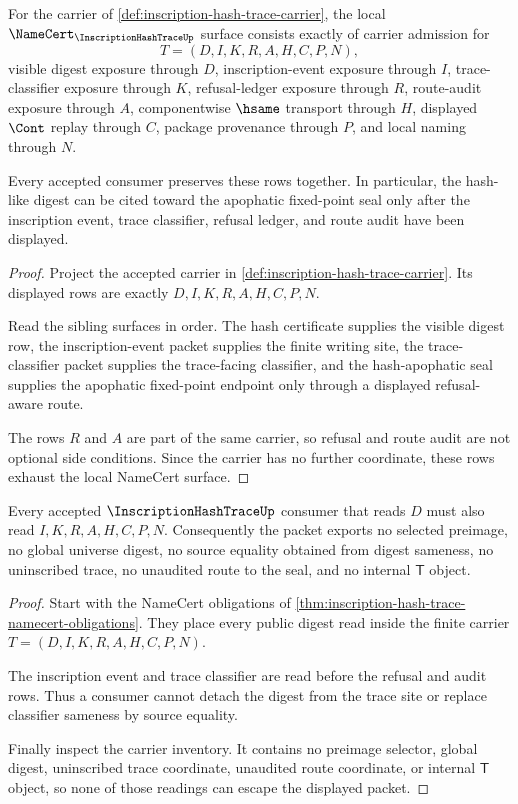 \begin{theorem}
\label{thm:inscription-hash-trace-namecert-obligations}
For the carrier of \autoref{def:inscription-hash-trace-carrier}, the local $\NameCert_{\InscriptionHashTraceUp}$ surface consists exactly of carrier admission for
$$
T=(D,I,K,R,A,H,C,P,N),
$$
visible digest exposure through $D$, inscription-event exposure through $I$, trace-classifier exposure through $K$, refusal-ledger exposure through $R$, route-audit exposure through $A$, componentwise $\hsame$ transport through $H$, displayed $\Cont$ replay through $C$, package provenance through $P$, and local naming through $N$.

Every accepted consumer preserves these rows together. In particular, the hash-like digest can be cited toward the apophatic fixed-point seal only after the inscription event, trace classifier, refusal ledger, and route audit have been displayed.
\end{theorem}
\begin{proof}
Project the accepted carrier in \autoref{def:inscription-hash-trace-carrier}. Its displayed rows are exactly $D,I,K,R,A,H,C,P,N$.

Read the sibling surfaces in order. The hash certificate supplies the visible digest row, the inscription-event packet supplies the finite writing site, the trace-classifier packet supplies the trace-facing classifier, and the hash-apophatic seal supplies the apophatic fixed-point endpoint only through a displayed refusal-aware route.

The rows $R$ and $A$ are part of the same carrier, so refusal and route audit are not optional side conditions. Since the carrier has no further coordinate, these rows exhaust the local NameCert surface.
\end{proof}

\begin{theorem}
\label{thm:inscription-hash-trace-refusal-nonescape}
Every accepted $\InscriptionHashTraceUp$ consumer that reads $D$ must also read $I,K,R,A,H,C,P,N$. Consequently the packet exports no selected preimage, no global universe digest, no source equality obtained from digest sameness, no uninscribed trace, no unaudited route to the seal, and no internal $\mathsf{T}$ object.
\end{theorem}
\begin{proof}
Start with the NameCert obligations of \autoref{thm:inscription-hash-trace-namecert-obligations}. They place every public digest read inside the finite carrier $T=(D,I,K,R,A,H,C,P,N)$.

The inscription event and trace classifier are read before the refusal and audit rows. Thus a consumer cannot detach the digest from the trace site or replace classifier sameness by source equality.

Finally inspect the carrier inventory. It contains no preimage selector, global digest, uninscribed trace coordinate, unaudited route coordinate, or internal $\mathsf{T}$ object, so none of those readings can escape the displayed packet.
\end{proof}


